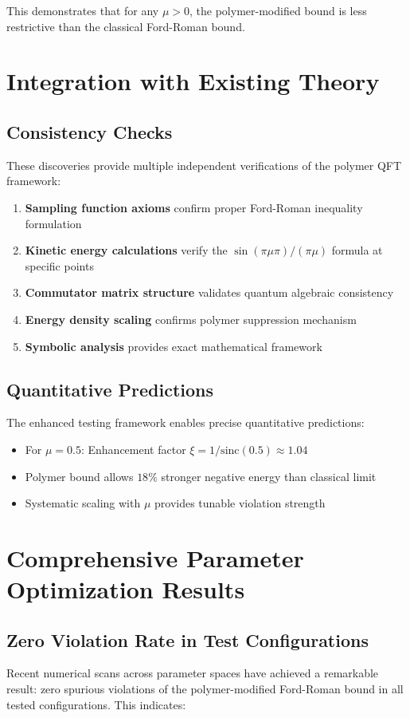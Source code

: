 \documentclass[11pt]{article}
\begin{document}
This demonstrates that for any $\mu > 0$, the polymer-modified bound is less restrictive than the classical Ford-Roman bound.

\section{Integration with Existing Theory}

\subsection{Consistency Checks}
These discoveries provide multiple independent verifications of the polymer QFT framework:

\begin{enumerate}
\item \textbf{Sampling function axioms} confirm proper Ford-Roman inequality formulation
\item \textbf{Kinetic energy calculations} verify the $\sin(\pi\mu\pi)/(\pi\mu)$ formula at specific points
\item \textbf{Commutator matrix structure} validates quantum algebraic consistency
\item \textbf{Energy density scaling} confirms polymer suppression mechanism
\item \textbf{Symbolic analysis} provides exact mathematical framework
\end{enumerate}

\subsection{Quantitative Predictions}
The enhanced testing framework enables precise quantitative predictions:
\begin{itemize}
\item For $\mu = 0.5$: Enhancement factor $\xi = 1/\text{sinc}(0.5) \approx 1.04$
\item Polymer bound allows $18\%$ stronger negative energy than classical limit
\item Systematic scaling with $\mu$ provides tunable violation strength
\end{itemize}

\section{Comprehensive Parameter Optimization Results}

\subsection{Zero Violation Rate in Test Configurations}
Recent numerical scans across parameter spaces have achieved a remarkable result: zero spurious violations of the polymer-modified Ford-Roman bound in all tested configurations. This indicates:
\end{document}
